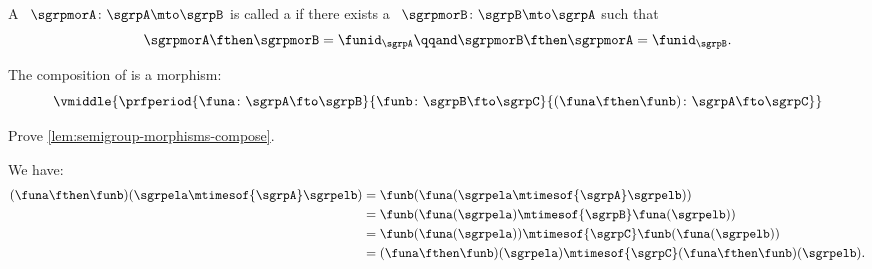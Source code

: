 

\begin{ctdefinition}
    \label{def:semigroup-isomorphism}
    A ~$\sgrpmorA\colon \sgrpA \mto \sgrpB$ is called a  if there exists a ~$\sgrpmorB\colon \sgrpB \mto \sgrpA$ such that
    \begin{equation}
        \label{eq:sgrp-iso-cond}
        \sgrpmorA \fthen \sgrpmorB = \funid_\sgrpA
        \qqand
        \sgrpmorB \fthen \sgrpmorA = \funid_\sgrpB.
    \end{equation}
\end{ctdefinition}

\begin{lemma}
    \label{lem:semigroup-morphisms-compose}
    The composition of  is a morphism:
    \begin{equation}
        \label{eq:sgrp-mor-compo}
        \vmiddle{
            \prfperiod{
                \funa \colon \sgrpA \fto \sgrpB
            }{
                \funb \colon \sgrpB \fto \sgrpC
            }{
                (\funa \fthen \funb) \colon \sgrpA \fto \sgrpC
            }
        }
    \end{equation}
\end{lemma}

\begin{exercise}
    Prove \cref{lem:semigroup-morphisms-compose}.
\end{exercise}
\begin{solution}
    We have:
    \begin{equation}
        \begin{aligned}
            (\funa \fthen \funb)(\sgrpela \mtimesof{\sgrpA} \sgrpelb)
             & =\funb(\funa(\sgrpela \mtimesof{\sgrpA} \sgrpelb)) \\
             & =\funb(\funa(\sgrpela)\mtimesof{\sgrpB}\funa(\sgrpelb)) \\
             & =\funb(\funa(\sgrpela))\mtimesof{\sgrpC} \funb(\funa(\sgrpelb)) \\
             & =(\funa \fthen \funb)(\sgrpela) \mtimesof{\sgrpC} (\funa \fthen \funb)(\sgrpelb).
        \end{aligned}
    \end{equation}
\end{solution}

